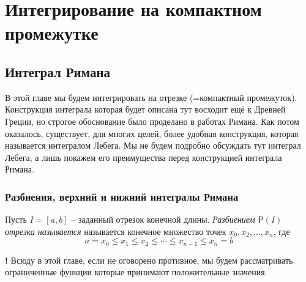 \chapter{Интегрирование на компактном промежутке}

\section{Интеграл Римана}


В этой главе мы будем интегрировать на отрезке (=компактный промежуток). Конструкция интеграла которая будет описана тут восходит ещё к Древней Греции, но строгое обоснование было проделано в работах Римана. Как потом оказалось, существует, для многих целей, более удобная конструкция, которая называется интегралом Лебега. Мы не будем подробно обсуждать тут интеграл Лебега, а лишь покажем его преимущества перед конструкцией интеграла Римана. 

\subsection{Разбиения, верхний и нижний интегралы Римана}


\begin{definition}
    Пусть $I =[a,b]$ -- заданный отрезок конечной длины. \textit{Разбиением $\mathsf{P}(I)$ отрезка называется} называется конечное множество точек $x_0,x_2,\ldots, x_n$, где
    \[
     a = x_0 \le x_1 \le x_2 \le \cdots \le x_{n-1} \le x_n =b
    \]
    
\end{definition}

\begin{mydangerr}{\bf !}
 Всюду в этой главе, если не оговорено противное, мы будем рассматривать ограниченные функции которые принимают положительные значения.    
\end{mydangerr}


